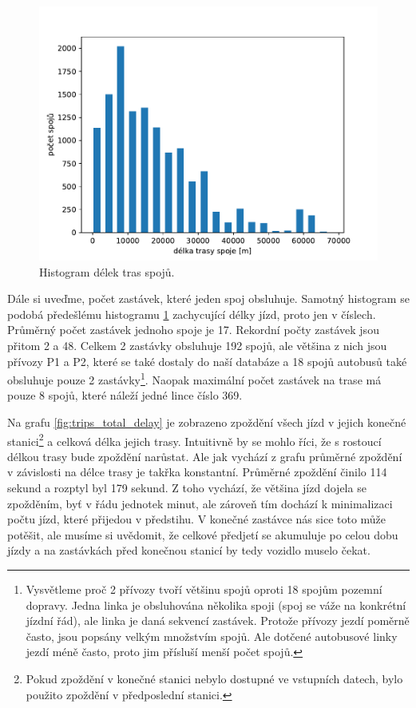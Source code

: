 \begin{figure}
   \centering
 \includegraphics[width=1\linewidth]{../img/trips_len}
 \caption{Histogram délek tras spojů.}
 \label{fig:trips_len}
\end{figure}


\bigbreak


Dále si uveďme, počet zastávek, které jeden spoj obsluhuje. Samotný histogram se podobá předešlému histogramu \ref{fig:trips_len} zachycující délky jízd, proto jen v číslech. Průměrný počet zastávek jednoho spoje je 17. Rekordní počty zastávek jsou přitom 2 a 48. Celkem 2 zastávky obsluhuje 192 spojů, ale většina z nich jsou přívozy P1 a P2, které se také dostaly do naší databáze a 18 spojů autobusů také obsluhuje pouze 2 zastávky\footnote{Vysvětleme proč 2 přívozy tvoří většinu spojů oproti 18 spojům pozemní dopravy. Jedna linka je obsluhována několika spoji (spoj se váže na konkrétní jízdní řád), ale linka je daná sekvencí zastávek. Protože přívozy jezdí poměrně často, jsou popsány velkým množstvím spojů. Ale dotčené autobusové linky jezdí méně často, proto jim přísluší menší počet spojů.}. Naopak maximální počet zastávek na trase má pouze 8 spojů, které náleží jedné lince číslo 369.


\bigbreak


Na grafu \ref{fig:trips_total_delay} je zobrazeno zpoždění všech jízd v jejich konečné stanici\footnote{Pokud zpoždění v konečné stanici nebylo dostupné ve vstupních datech, bylo použito zpoždění v předposlední stanici.} a celková délka jejich trasy. Intuitivně by se mohlo říci, že s rostoucí délkou trasy bude zpoždění narůstat. Ale jak vychází z grafu průměrné zpoždění v závislosti na délce trasy je takřka konstantní. Průměrné zpoždění činilo 114 sekund a rozptyl byl 179 sekund. Z toho vychází, že většina jízd dojela se zpožděním, byť v řádu jednotek minut, ale zároveň tím dochází k minimalizaci počtu jízd, které přijedou v předstihu. V konečné zastávce nás sice toto může potěšit, ale musíme si uvědomit, že celkové předjetí se akumuluje po celou dobu jízdy a na zastávkách před konečnou stanicí by tedy vozidlo muselo čekat.


